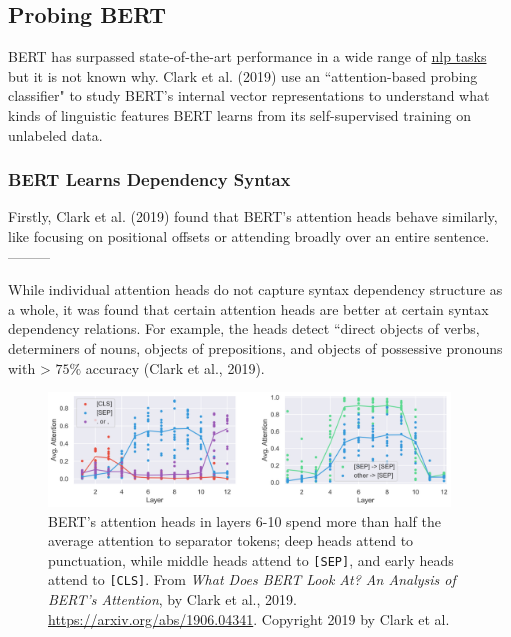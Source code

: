 \subsection{Probing BERT} \label{sec:ProbingBERT}

BERT has surpassed state-of-the-art performance in a wide range of \hyperref[app:Appendix_NLPTasks]{nlp tasks} but it is not known why. Clark et al. (2019) use an ``attention-based probing classifier" to study BERT's internal vector representations to understand what kinds of linguistic features BERT learns from its self-supervised training on unlabeled data. 

\subsubsection{BERT Learns Dependency Syntax} \label{sec:BERTLearnsSyntax}





Firstly, Clark et al. (2019) found that BERT's attention heads behave similarly, like focusing on positional offsets or attending broadly over an entire sentence. 
---------

While individual attention heads do not capture syntax dependency structure as a whole, it was found that certain attention heads are better at certain syntax dependency relations. For example, the heads detect ``direct objects of verbs, determiners of nouns, objects of prepositions, and objects of possessive pronouns with > $75 \%$ accuracy (Clark et al., 2019). 


\begin{figure}[h]
\vspace{-5pt}
\centering
\includegraphics[width=0.95\textwidth]{imgs/bert_attentionheads_SEP.png}
\vspace{-5pt}
\caption{\footnotesize BERT's attention heads in layers 6-10 spend more than half the average attention to separator tokens; deep heads attend to punctuation, while middle heads attend to \texttt{[SEP]}, and early heads attend to \texttt{[CLS]}. From \emph{What Does BERT Look At? An Analysis of BERT's Attention}, by Clark et al., 2019. \url{https://arxiv.org/abs/1906.04341}. Copyright 2019 by Clark et al.}
\vspace{-5pt}
\label{fig:bertSEPAttention}
\end{figure}


